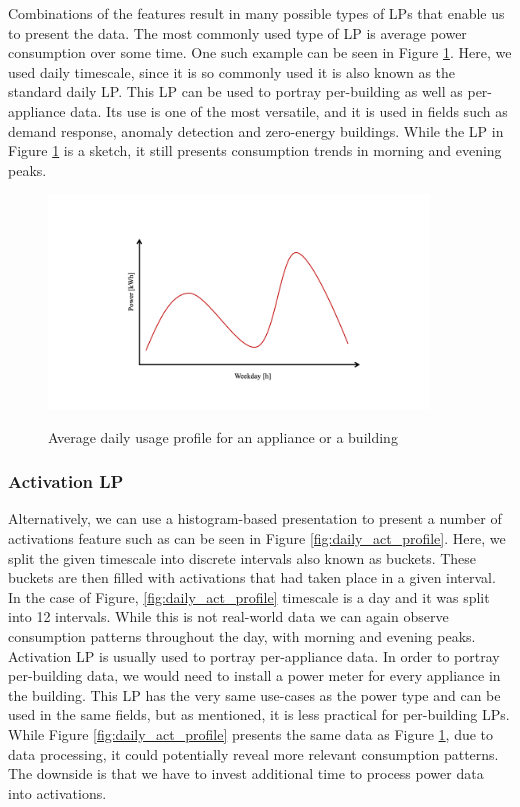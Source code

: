 Combinations of the features result in many possible types of LPs that enable us to present the data.
The most commonly used type of LP is average power consumption over some time.
One such example can be seen in Figure \ref{fig:daily_power_profile}. 
Here, we used daily timescale, since it is so commonly used it is also known as the standard daily LP. 
This LP can be used to portray per-building as well as per-appliance data.
Its use is one of the most versatile, and it is used in fields such as demand response, anomaly detection and zero-energy buildings.
While the LP in Figure \ref{fig:daily_power_profile} is a sketch, it still presents consumption trends in morning and evening peaks.
\begin{figure}[H]
	\centering
	\caption{Average daily usage profile for an appliance or a building}
	\includegraphics[width=0.9\textwidth]{Figures/profile_sketches/Slide1.png}
	\label{fig:daily_power_profile}
\end{figure}

\subsubsection{Activation LP}
Alternatively, we can use a histogram-based presentation to present a number of activations feature such as can be seen in Figure \ref{fig:daily_act_profile}.
Here, we split the given timescale into discrete intervals also known as buckets. 
These buckets are then filled with activations that had taken place in a given interval. 
In the case of Figure, \ref{fig:daily_act_profile} timescale is a day and it was split into 12 intervals.
While this is not real-world data we can again observe consumption patterns throughout the day, with morning and evening peaks. 
Activation LP is usually used to portray per-appliance data. 
In order to portray per-building data, we would need to install a power meter for every appliance in the building.
This LP has the very same use-cases as the power type and can be used in the same fields, but as mentioned, it is less practical for per-building LPs.
While Figure \ref{fig:daily_act_profile} presents the same data as Figure \ref{fig:daily_power_profile},
due to data processing, it could potentially reveal more relevant consumption patterns.
The downside is that we have to invest additional time to process power data into activations.

